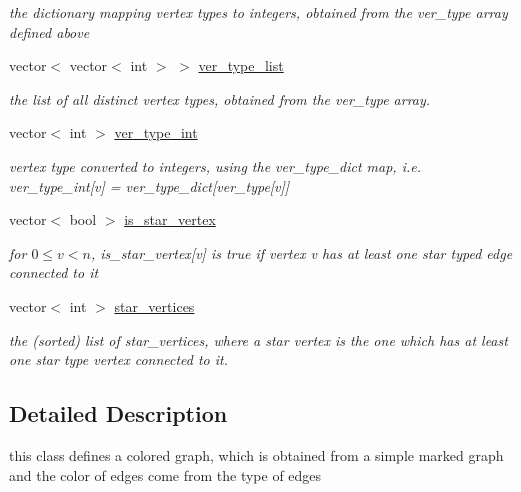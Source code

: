 \begin{DoxyCompactItemize}
\begin{DoxyCompactList}\small\item\em the dictionary mapping vertex types to integers, obtained from the ver\+\_\+type array defined above \end{DoxyCompactList}\item 
vector$<$ vector$<$ int $>$ $>$ \hyperlink{classcolored__graph_a3a1ae8abac458d20a2afb4aa48bbc956}{ver\+\_\+type\+\_\+list}
\begin{DoxyCompactList}\small\item\em the list of all distinct vertex types, obtained from the ver\+\_\+type array. \end{DoxyCompactList}\item 
vector$<$ int $>$ \hyperlink{classcolored__graph_a491ed2ea1a65118af02ec606c8d44c0a}{ver\+\_\+type\+\_\+int}
\begin{DoxyCompactList}\small\item\em vertex type converted to integers, using the ver\+\_\+type\+\_\+dict map, i.\+e. ver\+\_\+type\+\_\+int\mbox{[}v\mbox{]} = ver\+\_\+type\+\_\+dict\mbox{[}ver\+\_\+type\mbox{[}v\mbox{]}\mbox{]} \end{DoxyCompactList}\item 
vector$<$ bool $>$ \hyperlink{classcolored__graph_ad41163e970530c7e45878d299f0dc961}{is\+\_\+star\+\_\+vertex}
\begin{DoxyCompactList}\small\item\em for $0 \leq v < n$, is\+\_\+star\+\_\+vertex\mbox{[}v\mbox{]} is true if vertex v has at least one star typed edge connected to it \end{DoxyCompactList}\item 
vector$<$ int $>$ \hyperlink{classcolored__graph_ab7ee8d717abde7ad7467ef695038f574}{star\+\_\+vertices}
\begin{DoxyCompactList}\small\item\em the (sorted) list of star\+\_\+vertices, where a star vertex is the one which has at least one star type vertex connected to it. \end{DoxyCompactList}\end{DoxyCompactItemize}


\subsection{Detailed Description}
this class defines a colored graph, which is obtained from a simple marked graph and the color of edges come from the type of edges 

